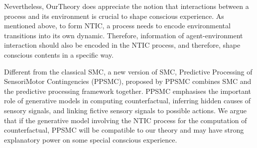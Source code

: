 \documentclass[utf8]{article}
\begin{document}
    	    Nevertheless, \ac{OurTheory} does appreciate the notion that interactions between a process and its environment is crucial to shape conscious experience. As mentioned above, to form NTIC, a process needs to encode environmental transitions into its own dynamic. Therefore, information of agent-environment interaction should also be encoded in the NTIC process, and therefore, shape conscious contents in a specific way. 
    	    
    	    Different from the classical SMC, a new version of SMC, Predictive Processing of SensoriMotor Contingencies (PPSMC), proposed by \cite{seth2014predictive, seth2015presence} PPSMC combines SMC and the predictive processing framework together. PPSMC emphasises the important role of generative models in computing counterfactual, inferring hidden causes of sensory signals, and linking fictive sensory signals to possible actions. We argue that if the generative model involving the NTIC process for the computation of counterfactual, PPSMC will be compatible to our theory and may have strong explanatory power on some special conscious experience.
    	    
    	    
    	   
		
\end{document}
